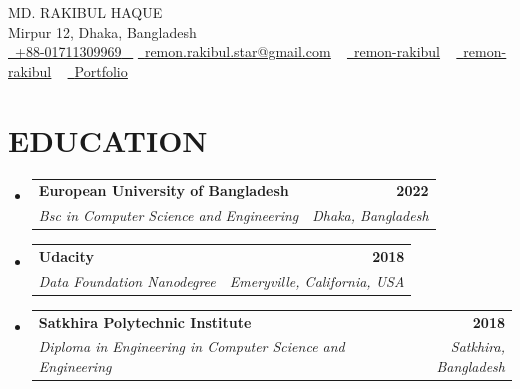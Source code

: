 \documentclass[letterpaper,11pt]{article}
\makeatletter
\newcommand{\resumeSubheading}[4]{
  \vspace{-2pt}\item
    \begin{tabular*}{1.0\textwidth}[t]{l@{\extracolsep{\fill}}r}
      \textbf{\large#1} & \textbf{\small #2} \\
      \textit{\large#3} & \textit{\small #4} \\
      
    \end{tabular*}\vspace{-7pt}
}
\newcommand{\resumeSubHeadingListStart}{\begin{itemize}[leftmargin=0.0in, label={}]}
\newcommand{\resumeSubHeadingListEnd}{\end{itemize}}
\makeatother
\begin{document}


\begin{center}
    {\Huge \scshape MD. RAKIBUL HAQUE} \\ \vspace{1pt}
    Mirpur 12, Dhaka, Bangladesh \\ \vspace{1pt}
    \small \href{tel:+xxxxxxxxxxxx}{ \raisebox{-0.1\height}\faPhone\ \underline{+88-01711309969} ~} \href{mailto:remon.rakibul.star@gmail.com}{\raisebox{-0.2\height}\faEnvelope\  \underline{remon.rakibul.star@gmail.com}} ~ 
    \href{https://linkedin.com/in/remon-rakibul}{\raisebox{-0.2\height}\faLinkedinSquare\ \underline{remon-rakibul}}  ~
    \href{https://github.com/remon-rakibul}{\raisebox{-0.2\height}\faGithub\ \underline{remon-rakibul}} ~
    \href{https://portfolio-remon-rakibuls-projects.vercel.app/}{\raisebox{-0.2\height}\faGlobe\ \underline{Portfolio}} ~
    \vspace{-8pt}
\end{center}


\section{EDUCATION}
  \resumeSubHeadingListStart
    \resumeSubheading
      {European University of Bangladesh}{
      2022}
      {Bsc in Computer Science and Engineering
 }
 {Dhaka, Bangladesh}
  \resumeSubHeadingListEnd

    \resumeSubHeadingListStart
    \resumeSubheading
      {Udacity}{
      2018}
      {Data Foundation Nanodegree}{Emeryville, California, USA}
  \resumeSubHeadingListEnd
  
  \resumeSubHeadingListStart
    \resumeSubheading
      {Satkhira Polytechnic Institute}{
      2018}
      {Diploma in Engineering in Computer Science and Engineering
 }
 {Satkhira, Bangladesh}
  \resumeSubHeadingListEnd
  
  
\end{document}
